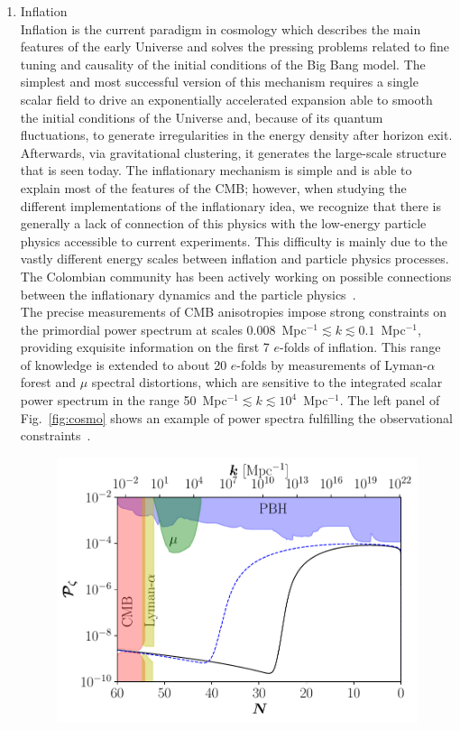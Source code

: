 \documentclass[a4paper,11pt]{article}
\begin{document}
\begin{enumerate}
\item 
Inflation\\
Inflation is the current paradigm in cosmology which describes the main features of the early Universe and solves the pressing problems related to fine tuning and causality of the initial conditions of the Big Bang model. The simplest and most successful version of this mechanism requires a single scalar field to drive an exponentially accelerated expansion able to smooth the initial conditions of the Universe and, because of its quantum fluctuations, to generate irregularities in the energy density after horizon exit. Afterwards, via gravitational clustering, it generates the large-scale structure that is seen today. The inflationary mechanism is simple and is able to explain most of the features of the CMB; however, when studying the different implementations of the inflationary idea, we recognize that there is generally a lack of connection of this physics with the low-energy particle physics accessible to current experiments. This difficulty is mainly due to the vastly different energy scales between inflation and particle physics processes.
The Colombian community has been actively working on possible connections between the inflationary dynamics and the particle physics~\cite{Bernal:2018hjm, Almeida:2018oid, Bernal:2020bfj, Bernal:2020qyu, Almeida:2020kaq}.\\
The precise measurements of CMB anisotropies impose strong constraints on the primordial power spectrum at scales 0.008~Mpc$^{-1}\lesssim k \lesssim 0.1$~Mpc$^{-1}$, providing exquisite information on the first 7 $e$-folds of inflation. This range of knowledge is extended to about 20 $e$-folds by measurements of Lyman-$\alpha$ forest and $\mu$ spectral distortions, which are sensitive to the integrated scalar power spectrum in the range 50~Mpc$^{-1}\lesssim k\lesssim 10^4$~Mpc$^{-1}$. The left panel of
Fig.~\ref{fig:cosmo} shows an example of power spectra fulfilling the observational constraints~\cite{Almeida:2020kaq}.
\begin{figure}
	\centering
	\includegraphics[scale=0.55]{plots/spectrum.pdf}

\end{figure}
\end{enumerate}
\end{document}
